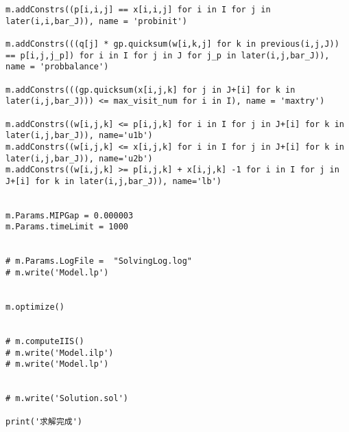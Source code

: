 \begin{lstlisting}
m.addConstrs((p[i,i,j] == x[i,i,j] for i in I for j in later(i,i,bar_J)), name = 'probinit')

m.addConstrs(((q[j] * gp.quicksum(w[i,k,j] for k in previous(i,j,J)) 
== p[i,j,j_p]) for i in I for j in J for j_p in later(i,j,bar_J)), name = 'probbalance')

m.addConstrs(((gp.quicksum(x[i,j,k] for j in J+[i] for k in later(i,j,bar_J))) <= max_visit_num for i in I), name = 'maxtry')

m.addConstrs((w[i,j,k] <= p[i,j,k] for i in I for j in J+[i] for k in later(i,j,bar_J)), name='u1b')
m.addConstrs((w[i,j,k] <= x[i,j,k] for i in I for j in J+[i] for k in later(i,j,bar_J)), name='u2b')
m.addConstrs((w[i,j,k] >= p[i,j,k] + x[i,j,k] -1 for i in I for j in J+[i] for k in later(i,j,bar_J)), name='lb')


m.Params.MIPGap = 0.000003
m.Params.timeLimit = 1000


# m.Params.LogFile =  "SolvingLog.log"
# m.write('Model.lp')


m.optimize()


# m.computeIIS()
# m.write('Model.ilp')
# m.write('Model.lp')


# m.write('Solution.sol')

print('求解完成')

\end{lstlisting}


